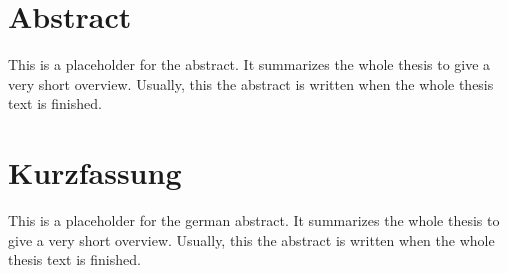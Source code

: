 \chapter*{Abstract}
\label{cha:abstract}

This is a placeholder for the abstract. It summarizes the whole thesis to give a very short overview. Usually, this the
abstract is written when the whole thesis text is finished.

\chapter*{Kurzfassung}
\label{cha:abstract_german}

This is a placeholder for the german abstract. It summarizes the whole thesis to give a very short overview. Usually,
this the abstract is written when the whole thesis text is finished.
